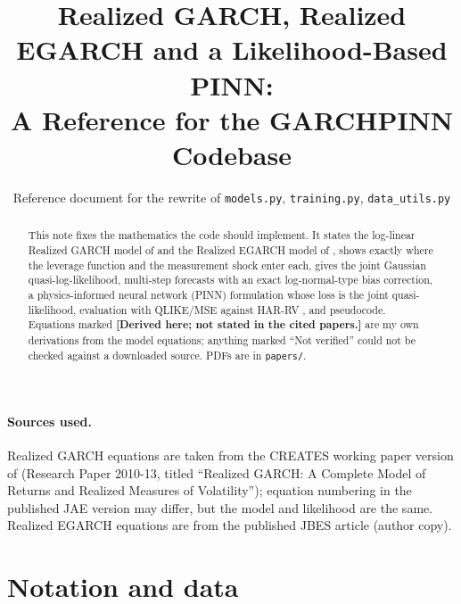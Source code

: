 \documentclass[11pt]{article}
\title{Realized GARCH, Realized EGARCH and a Likelihood-Based PINN:\\
A Reference for the GARCHPINN Codebase}
\author{Reference document for the rewrite of \texttt{models.py}, \texttt{training.py}, \texttt{data\_utils.py}}
\date{}
\newcommand{\derived}{\textbf{[Derived here; not stated in the cited papers.]}}
\begin{document}
\maketitle

\begin{abstract}
This note fixes the mathematics the code should implement. It states the log-linear
Realized GARCH model of \cite{HHS2012} and the Realized EGARCH model of \cite{HH2016},
shows exactly where the leverage function and the measurement shock enter each, gives the
joint Gaussian quasi-log-likelihood, multi-step forecasts with an exact log-normal-type
bias correction, a physics-informed neural network (PINN) formulation whose loss is the
joint quasi-likelihood, evaluation with QLIKE/MSE \cite{Patton2011} against HAR-RV
\cite{Corsi2009}, and pseudocode. Equations marked \derived{} are my own derivations from the
model equations; anything marked ``Not verified'' could not be checked against a downloaded
source. PDFs are in \texttt{papers/}.
\end{abstract}

\paragraph{Sources used.} Realized GARCH equations are taken from the CREATES working paper
version of \cite{HHS2012} (Research Paper 2010-13, titled ``Realized GARCH: A Complete Model of
Returns and Realized Measures of Volatility''); equation numbering in the published JAE
version may differ, but the model and likelihood are the same.
Realized EGARCH equations are from the published JBES article \cite{HH2016} (author copy).

\tableofcontents

\section{Notation and data}
\end{document}
